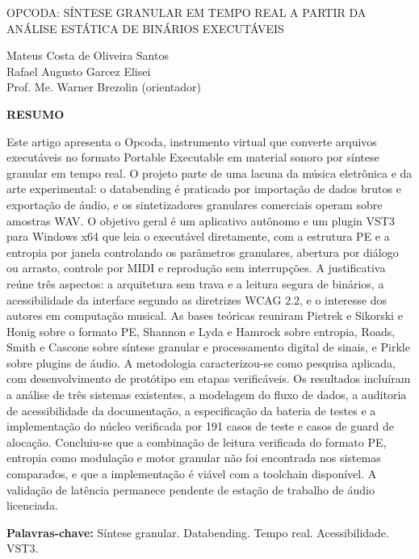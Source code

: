 \documentclass[11pt,a4paper]{article}
\begin{document}
\begin{center}\MakeUppercase{Opcoda: síntese granular em tempo real a partir da análise estática de binários executáveis}\end{center}

\begin{flushright}Mateus Costa de Oliveira Santos\\[0.4em]Rafael Augusto Garcez Elisei\\[0.4em]Prof. Me. Warner Brezolin (orientador)\par\end{flushright}

{\small

\noindent\textbf{RESUMO}\par\vspace{2pt}
\noindent Este artigo apresenta o Opcoda, instrumento virtual que converte arquivos executáveis no formato Portable Executable em material sonoro por síntese granular em tempo real. O projeto parte de uma lacuna da música eletrônica e da arte experimental: o databending é praticado por importação de dados brutos e exportação de áudio, e os sintetizadores granulares comerciais operam sobre amostras WAV. O objetivo geral é um aplicativo autônomo e um plugin VST3 para Windows x64 que leia o executável diretamente, com a estrutura PE e a entropia por janela controlando os parâmetros granulares, abertura por diálogo ou arrasto, controle por MIDI e reprodução sem interrupções. A justificativa reúne três aspectos: a arquitetura sem trava e a leitura segura de binários, a acessibilidade da interface segundo as diretrizes WCAG 2.2, e o interesse dos autores em computação musical. As bases teóricas reuniram Pietrek e Sikorski e Honig sobre o formato PE, Shannon e Lyda e Hamrock sobre entropia, Roads, Smith e Cascone sobre síntese granular e processamento digital de sinais, e Pirkle sobre plugins de áudio. A metodologia caracterizou-se como pesquisa aplicada, com desenvolvimento de protótipo em etapas verificáveis. Os resultados incluíram a análise de três sistemas existentes, a modelagem do fluxo de dados, a auditoria de acessibilidade da documentação, a especificação da bateria de testes e a implementação do núcleo verificada por 191 casos de teste e casos de guard de alocação. Concluiu-se que a combinação de leitura verificada do formato PE, entropia como modulação e motor granular não foi encontrada nos sistemas comparados, e que a implementação é viável com a toolchain disponível. A validação de latência permanece pendente de estação de trabalho de áudio licenciada.\par
\vspace{4pt}\noindent\textbf{Palavras-chave:} Síntese granular. Databending. Tempo real. Acessibilidade. VST3.\par

}
\end{document}
